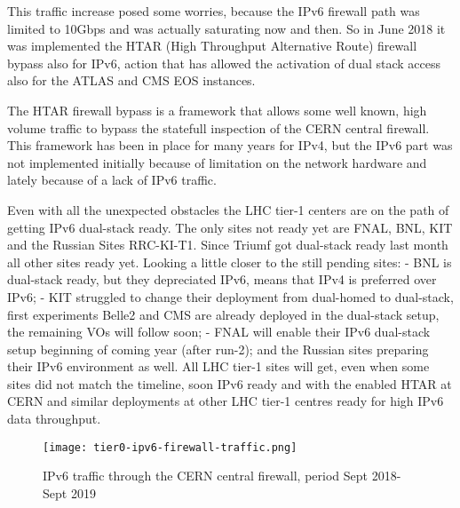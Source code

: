 This traffic increase posed some worries, because the IPv6 firewall path was limited to 10Gbps and was actually saturating now and then. So in June 2018 it was implemented the HTAR (High Throughput Alternative Route) firewall bypass also for IPv6, action that has allowed the activation of dual stack access also for the ATLAS and CMS EOS instances.    
 
The HTAR firewall bypass is a framework that allows some well known, high volume traffic to bypass the statefull inspection of the CERN central firewall. This framework has been in place for many years for IPv4, but the IPv6 part was not implemented initially because of limitation on the network hardware and lately because of a lack of IPv6 traffic.  

Even with all the unexpected obstacles the LHC tier-1 centers are on the path of getting IPv6 dual-stack ready. The only sites not ready yet are FNAL, BNL, KIT and the Russian Sites RRC-KI-T1. Since Triumf got dual-stack ready last month all other sites ready yet. Looking a little closer to the still pending sites: 
-	BNL is dual-stack ready, but they depreciated IPv6, means that IPv4 is preferred over IPv6;
-	KIT struggled to change their deployment from dual-homed to dual-stack, first experiments Belle2 and CMS are already deployed in the dual-stack setup, the remaining VOs will follow soon; 
-	FNAL will enable their IPv6 dual-stack setup beginning of coming year (after run-2); and the Russian sites preparing their IPv6 environment as well.
All LHC tier-1 sites will get, even when some sites did not match the timeline, soon IPv6 ready and with the enabled HTAR at CERN and similar deployments at other LHC tier-1 centres ready for high IPv6 data throughput.



\begin{figure}[h!]
\centering
\texttt{[image: tier0-ipv6-firewall-traffic.png]}
\caption{IPv6 traffic through the CERN central firewall, period Sept 2018-Sept 2019}
\label{fig:tier0-traffic}
\end{figure}
